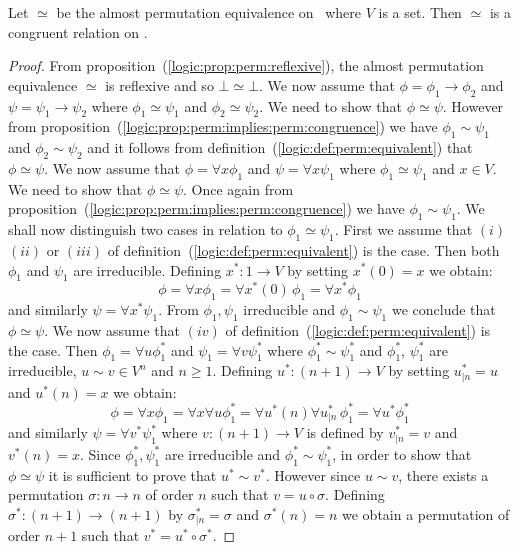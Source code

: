 \begin{prop}\label{logic:prop:perm:congruent}
Let $\simeq$ be the almost permutation equivalence on \pv\ where $V$
is a set. Then $\simeq$ is a congruent relation on \pv.
\end{prop}
\begin{proof}
From proposition~(\ref{logic:prop:perm:reflexive}), the almost
permutation equivalence $\simeq$ is reflexive and so
$\bot\simeq\bot$. We now assume that $\phi=\phi_{1}\to\phi_{2}$ and
$\psi=\psi_{1}\to\psi_{2}$ where $\phi_{1}\simeq\psi_{1}$ and
$\phi_{2}\simeq\psi_{2}$. We need to show that $\phi\simeq\psi$.
However from
proposition~(\ref{logic:prop:perm:implies:perm:congruence}) we have
$\phi_{1}\sim\psi_{1}$ and $\phi_{2}\sim\psi_{2}$ and it follows
from definition~(\ref{logic:def:perm:equivalent}) that
$\phi\simeq\psi$. We now assume that $\phi=\forall x\phi_{1}$ and
$\psi=\forall x\psi_{1}$ where $\phi_{1}\simeq\psi_{1}$ and $x\in
V$. We need to show that $\phi\simeq\psi$. Once again from
proposition~(\ref{logic:prop:perm:implies:perm:congruence}) we have
$\phi_{1}\sim\psi_{1}$. We shall now distinguish two cases in
relation to $\phi_{1}\simeq\psi_{1}$. First we assume that $(i)$
$(ii)$ or $(iii)$ of definition~(\ref{logic:def:perm:equivalent}) is
the case. Then both $\phi_{1}$ and $\psi_{1}$ are irreducible.
Defining $x^{*}:1\to V$ by setting $x^{*}(0)=x$ we obtain:
    \[
    \phi=\forall x\phi_{1}=\forall x^{*}(0)\,\phi_{1}=\forall x^{*}\phi_{1}
    \]
and similarly $\psi=\forall x^{*}\psi_{1}$. From $\phi_{1},\psi_{1}$
irreducible and $\phi_{1}\sim\psi_{1}$ we conclude that
$\phi\simeq\psi$. We now assume that $(iv)$ of
definition~(\ref{logic:def:perm:equivalent}) is the case. Then
$\phi_{1}=\forall u\phi_{1}^{*}$ and $\psi_{1}=\forall
v\psi_{1}^{*}$ where $\phi_{1}^{*}\sim\psi_{1}^{*}$ and
$\phi_{1}^{*}$, $\psi_{1}^{*}$ are irreducible, $u\sim v\in V^{n}$
and $n\geq 1$. Defining $u^{*}:(n+1)\to V$ by setting $u^{*}_{|n}=u$
and $u^{*}(n)=x$ we obtain:
    \[
    \phi=\forall x\phi_{1}=\forall x\forall u\phi_{1}^{*}=\forall
    u^{*}(n)\forall u^{*}_{|n}\,\phi_{1}^{*}=\forall u^{*}\phi_{1}^{*}
    \]
and similarly $\psi=\forall v^{*}\psi_{1}^{*}$ where $v:(n+1)\to V$
is defined by $v^{*}_{|n}=v$ and $v^{*}(n)=x$. Since $\phi_{1}^{*},
\psi_{1}^{*}$ are irreducible and $\phi_{1}^{*}\sim\psi_{1}^{*}$, in
order to show that $\phi\simeq\psi$ it is sufficient to prove that
$u^{*}\sim v^{*}$. However since $u\sim v$, there exists a
permutation $\sigma:n\to n$ of order $n$ such that $v=u\circ\sigma$.
Defining $\sigma^{*}:(n+1)\to (n+1)$ by $\sigma^{*}_{|n}=\sigma$ and
$\sigma^{*}(n)=n$ we obtain a permutation of order $n+1$ such that
$v^{*}=u^{*}\circ\sigma^{*}$.
\end{proof}
